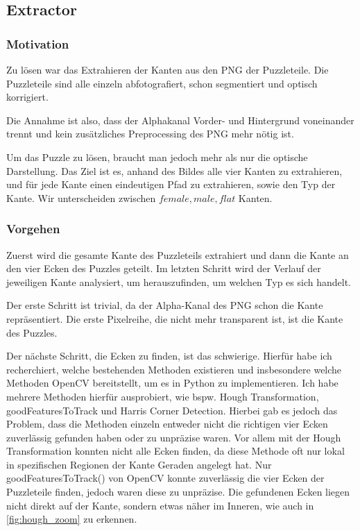 \subsection[Extractor]{Extractor } \label{sec:extractor}

\subsubsection{Motivation}
Zu lösen war das Extrahieren der Kanten aus den PNG der Puzzleteile. Die Puzzleteile sind alle einzeln abfotografiert, schon segmentiert und optisch korrigiert.

Die Annahme ist also, dass der Alphakanal Vorder- und Hintergrund voneinander trennt und kein zusätzliches Preprocessing des PNG mehr nötig ist.

Um das Puzzle zu lösen, braucht man jedoch mehr als nur die optische Darstellung. Das Ziel ist es, anhand des Bildes alle vier Kanten zu extrahieren, und für jede Kante einen eindeutigen Pfad zu extrahieren, sowie den Typ der Kante. Wir unterscheiden zwischen $female, male, flat$ Kanten.

\subsubsection{Vorgehen}
Zuerst wird die gesamte Kante des Puzzleteils extrahiert und dann die Kante an den vier Ecken des Puzzles geteilt. Im letzten Schritt wird der Verlauf der jeweiligen Kante analysiert, um herauszufinden, um welchen Typ es sich handelt.

Der erste Schritt ist trivial, da der Alpha-Kanal des PNG schon die Kante repräsentiert. Die erste Pixelreihe, die nicht mehr transparent ist, ist die Kante des Puzzles.

Der nächste Schritt, die Ecken zu finden, ist das schwierige. Hierfür habe ich recherchiert, welche bestehenden Methoden existieren und insbesondere welche Methoden OpenCV bereitstellt, um es in Python zu implementieren. Ich habe mehrere Methoden hierfür ausprobiert, wie bspw. Hough Transformation, goodFeaturesToTrack und Harris Corner Detection. Hierbei gab es jedoch das Problem, dass die Methoden einzeln entweder nicht die richtigen vier Ecken zuverlässig gefunden haben oder zu unpräzise waren. Vor allem mit der Hough Transformation konnten nicht alle Ecken finden, da diese Methode oft nur lokal in spezifischen Regionen der Kante Geraden angelegt hat.
Nur goodFeaturesToTrack() von OpenCV konnte zuverlässig die vier Ecken der Puzzleteile finden, jedoch waren diese zu unpräzise. Die gefundenen Ecken liegen nicht direkt auf der Kante, sondern etwas näher im Inneren, wie auch in \autoref{fig:hough_zoom} zu erkennen.

